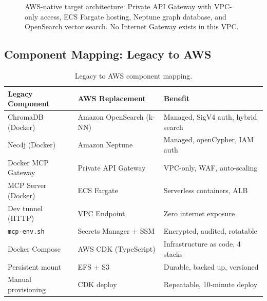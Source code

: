 \documentclass[11pt,letterpaper]{article}
\begin{document}
\begin{figure}[H]
\caption{AWS-native target architecture: Private API Gateway with VPC-only access,
ECS Fargate hosting, Neptune graph database, and OpenSearch vector search.
No Internet Gateway exists in this VPC.}
\label{fig:aws-arch}
\end{figure}

\subsection{Component Mapping: Legacy to AWS}

\begin{table}[H]
\centering
\footnotesize
\begin{tabular}{@{}lll@{}}
\toprule
\textbf{Legacy Component} & \textbf{AWS Replacement} & \textbf{Benefit} \\
\midrule
ChromaDB (Docker) & Amazon OpenSearch (k-NN) & Managed, SigV4 auth, hybrid search \\
Neo4j (Docker) & Amazon Neptune & Managed, openCypher, IAM auth \\
Docker MCP Gateway & Private API Gateway & VPC-only, WAF, auto-scaling \\
MCP Server (Docker) & ECS Fargate & Serverless containers, ALB \\
Dev tunnel (HTTP) & VPC Endpoint & Zero internet exposure \\
\texttt{mcp-env.sh} & Secrets Manager + SSM & Encrypted, audited, rotatable \\
Docker Compose & AWS CDK (TypeScript) & Infrastructure as code, 4 stacks \\
Persistent mount & EFS + S3 & Durable, backed up, versioned \\
Manual provisioning & CDK deploy & Repeatable, 10-minute deploy \\
\bottomrule
\end{tabular}
\caption{Legacy to AWS component mapping.}
\label{tab:component-mapping}
\end{table}
\end{document}
